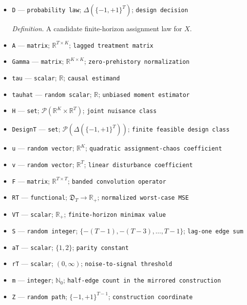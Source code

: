\documentclass{article}
\begin{document}
\begin{itemize}
  \item \texttt{D} --- \texttt{probability law}; \(\Delta(\{-1,+1\}^T)\); \texttt{design decision}
  \par\smallskip\noindent\emph{Definition.} A candidate finite-horizon assignment law for \(X\).
  \item \texttt{A} --- \texttt{matrix}; \(\mathbb R^{T\times K}\); \texttt{lagged treatment matrix}
  \item \texttt{Gamma} --- \texttt{matrix}; \(\mathbb R^{K\times K}\); \texttt{zero-\allowbreak{}prehistory normalization}
  \item \texttt{tau} --- \texttt{scalar}; \(\mathbb R\); \texttt{causal estimand}
  \item \texttt{tauhat} --- \texttt{random scalar}; \(\mathbb R\); \texttt{unbiased moment estimator}
  \item \texttt{H} --- \texttt{set}; \(\mathcal P(\mathbb R^K\times\mathbb R^T)\); \texttt{joint nuisance class}
  \item \texttt{DesignT} --- \texttt{set}; \(\mathcal P(\Delta(\{-1,+1\}^T))\); \texttt{finite feasible design class}
  \item \texttt{u} --- \texttt{random vector}; \(\mathbb R^K\); \texttt{quadratic assignment-\allowbreak{}chaos coefficient}
  \item \texttt{v} --- \texttt{random vector}; \(\mathbb R^T\); \texttt{linear disturbance coefficient}
  \item \texttt{F} --- \texttt{matrix}; \(\mathbb R^{T\times T}\); \texttt{banded convolution operator}
  \item \texttt{RT} --- \texttt{functional}; \(\mathfrak D_T\to\mathbb R_+\); \texttt{normalized worst-\allowbreak{}case MSE}
  \item \texttt{VT} --- \texttt{scalar}; \(\mathbb R_+\); \texttt{finite-\allowbreak{}horizon minimax value}
  \item \texttt{S} --- \texttt{random integer}; \(\{-(T-1),-(T-3),\ldots,T-1\}\); \texttt{lag-\allowbreak{}one edge sum}
  \item \texttt{aT} --- \texttt{scalar}; \(\{1,2\}\); \texttt{parity constant}
  \item \texttt{rT} --- \texttt{scalar}; \((0,\infty)\); \texttt{noise-\allowbreak{}to-\allowbreak{}signal threshold}
  \item \texttt{m} --- \texttt{integer}; \(\mathbb N_0\); \texttt{half-\allowbreak{}edge count in the mirrored construction}
  \item \texttt{Z} --- \texttt{random path}; \(\{-1,+1\}^{T-1}\); \texttt{construction coordinate}

\end{itemize}
\end{document}
